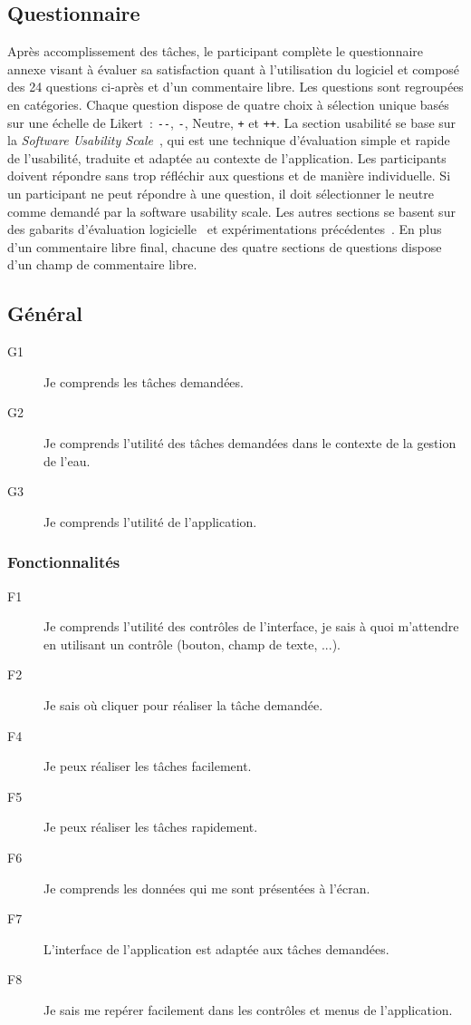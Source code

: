 \documentclass[a4paper, 11pt]{article}
\begin{document}
    \subsection*{Questionnaire}
        Après accomplissement des tâches, le participant complète le questionnaire annexe visant à évaluer sa satisfaction quant à l'utilisation du logiciel et composé des 24 questions ci-après et d'un commentaire libre. Les questions sont regroupées en catégories. Chaque question dispose
        de quatre choix à sélection unique basés sur une échelle de Likert~\cite{wikipediaLikertScale}: \texttt{-{}-}, \texttt{-}, Neutre, \texttt{+} et \texttt{++}.
        La section usabilité se base sur la \emph{Software Usability Scale}~\cite{sus, usagov}, qui est une technique d'évaluation simple et rapide de l'usabilité, traduite et adaptée au contexte de l'application. Les participants doivent répondre sans trop réfléchir aux questions et de manière individuelle. Si un participant ne peut répondre à une question, il doit sélectionner le neutre comme demandé par la software usability scale. Les autres sections se basent sur des gabarits d'évaluation logicielle~\cite{ssi} et expérimentations précédentes~\cite{richardbastin}. En plus d'un commentaire libre final, chacune des quatre sections de questions dispose d'un champ de commentaire libre.

        \subsection{Général}
            \begin{description}
                \item[G1] Je comprends les tâches demandées.
                \item[G2] Je comprends l'utilité des tâches demandées dans le contexte de la gestion de l'eau.
                \item[G3] Je comprends l'utilité de l'application.
            \end{description}
        \subsubsection*{Fonctionnalités}
            \begin{description}
                \item[F1] Je comprends l'utilité des contrôles de l'interface, je sais à quoi m'attendre en utilisant un contrôle (bouton, champ de texte, ...).
                \item[F2] Je sais où cliquer pour réaliser la tâche demandée.
                \item[F4] Je peux réaliser les tâches facilement.
                \item[F5] Je peux réaliser les tâches rapidement.
                \item[F6] Je comprends les données qui me sont présentées à l'écran.
                \item[F7] L'interface de l'application est adaptée aux tâches demandées.
                \item[F8] Je sais me repérer facilement dans les contrôles et menus de l'application.
            \end{description}
\end{document}
